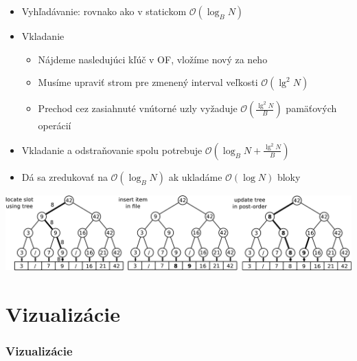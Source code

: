 \documentclass{beamer}
\newcommand{\bigO}{\ensuremath{\mathcal{O}}}
\begin{document}
\begin{frame}
    \begin{itemize}
        \item Vyhľadávanie: rovnako ako v statickom $\bigO(\log_B N)$
        \item Vkladanie
        \begin{itemize}
            \item Nájdeme nasledujúci kľúč v OF, vložíme nový za neho
            \item Musíme upraviť strom pre zmenený interval veľkosti $\bigO(\lg^2 N)$
            \item Prechod cez zasiahnuté vnútorné uzly vyžaduje $\bigO(\frac{\lg^2 N}{B})$ pamäťových operácií
        \end{itemize}
        \item Vkladanie a odstraňovanie spolu potrebuje $\bigO(\log_B N + \frac{\lg^2 N}{B})$
        \item Dá sa zredukovať na $\bigO(\log_B N)$ ak ukladáme $\bigO(\log N)$ bloky
    \end{itemize}
    \begin{center}
        \includegraphics[width=\textwidth]{../figures/downloaded_dont_use/dyn-insert.pdf}
    \end{center}
\end{frame}

\section{Vizualizácie}
\begin{frame}
    \frametitle{Vizualizácie}
\end{frame}
\end{document}
